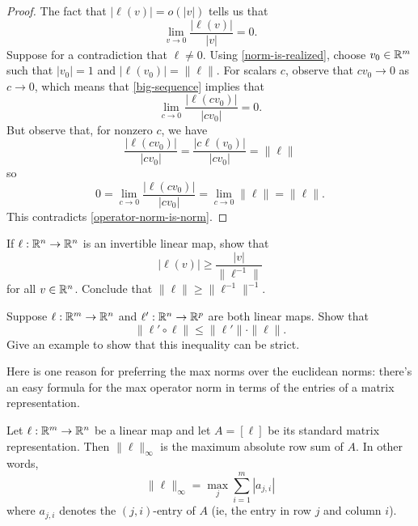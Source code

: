 \begin{proof}
The fact that $|\ell(v)| = o(|v|)$ tells us that
\begin{equation} \label{big-sequence} \lim_{v \to 0} \frac{|\ell(v)|}{|v|} = 0. \end{equation}
Suppose for a contradiction that $\ell \neq 0$. Using \cref{norm-is-realized}, choose $v_0 \in \mathbb{R}^m$ such that $|v_0| = 1$ and $|\ell(v_0)| = \|\ell\|$. For scalars $c$, observe that $cv_0 \to 0$ as $c \to 0$, which means that \cref{big-sequence} implies that
\[ \lim_{c \to 0} \frac{|\ell(cv_0)|}{|cv_0|} = 0.  \]
But observe that, for nonzero $c$, we have
\[ \frac{|\ell(cv_0)|}{|cv_0|} = \frac{|c\ell(v_0)|}{|cv_0|} = \|\ell\| \]
so
\[ 0 = \lim_{c \to 0} \frac{|\ell(cv_0)|}{|cv_0|} = \lim_{c \to 0} \|\ell\| = \|\ell\|. \]
This contradicts \cref{operator-norm-is-norm}. 
\end{proof}

\begin{exercise} \label{operator-norm-inverse}
	If $\ell : \mathbb{R}^n \to \mathbb{R}^n$ is an invertible linear map, show that
	\[ |\ell(v)| \geq \frac{|v|}{\|\ell^{-1}\|} \]
	for all $v \in \mathbb{R}^n$. Conclude that $\|\ell\| \geq \|\ell^{-1}\|^{-1}$. 
\end{exercise}

\begin{exercise}[Submultiplicativity] \label{operator-norm-submultiplicative} 
	Suppose $\ell : \mathbb{R}^m \to \mathbb{R}^n$ and $\ell' : \mathbb{R}^n \to \mathbb{R}^p$ are both linear maps. Show that \[ \|\ell' \circ \ell\| \leq \|\ell'\| \cdot \|\ell\|. \]
	Give an example to show that this inequality can be strict. 
\end{exercise}

Here is one reason for preferring the max norms over the euclidean norms: there's an easy formula for the max operator norm in terms of the entries of a matrix representation.

\begin{proposition} \label{max-operator-norm-characterization}
	Let $\ell : \mathbb{R}^m \to \mathbb{R}^n$ be a linear map and let $A = [\ell]$ be its standard matrix representation. Then $\|\ell\|_\infty$ is the maximum absolute row sum of $A$. In other words, 
	\[ \|\ell\|_\infty = \max_j \sum_{i = 1}^m |a_{j,i}| \]
	where $a_{j,i}$ denotes the $(j,i)$-entry of $A$ (ie, the entry in row $j$ and column $i$). 
\end{proposition}

